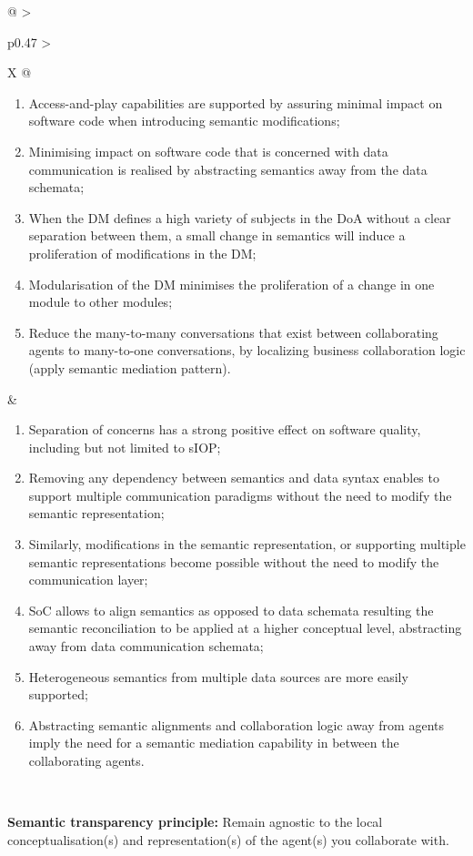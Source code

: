 \begin{xltabular}[l]{\linewidth}{@{} >{\small\raggedright\arraybackslash}p{0.47\linewidth} >{\small\raggedright\arraybackslash}X @{}}
\begin{enumerate}[left=6pt, nosep]
  \item Access-and-play capabilities are supported by assuring minimal impact on software code when introducing semantic modifications;
  \item Minimising impact on software code that is concerned with data communication is realised by abstracting semantics away from the data schemata;
  \item When the DM defines a high variety of subjects in the DoA without a clear separation between them, a small change in semantics will induce a proliferation of modifications in the DM;
  \item Modularisation of the DM minimises the proliferation of a change in one module to other modules;
  \item Reduce the many-to-many conversations that exist between collaborating agents to many-to-one conversations, by localizing business collaboration logic (apply semantic mediation pattern).
\end{enumerate}
&
\begin{enumerate}[left=10pt, nosep]
  \item Separation of concerns has a strong positive effect on software quality, including but not limited to sIOP;
  \item Removing any dependency between semantics and data syntax enables to support multiple communication paradigms without the need to modify the semantic representation;
  \item Similarly, modifications in the semantic representation, or supporting multiple semantic representations become possible without the need to modify the communication layer;
  \item SoC allows to align semantics as opposed to data schemata resulting the semantic reconciliation to be applied at a higher conceptual level, abstracting away from data communication schemata;
  \item Heterogeneous semantics from multiple data sources are more easily supported;
  \item Abstracting semantic alignments and collaboration logic away from agents imply the need for a semantic mediation capability in between the collaborating agents.
\end{enumerate} \\
%
%
%
\begin{mmdp}\label{dp:st}{\bfseries Semantic transparency principle:}
\quad Remain agnostic to the local conceptualisation(s) and representation(s) of the agent(s) you collaborate with. \end{mmdp}

\end{xltabular}
